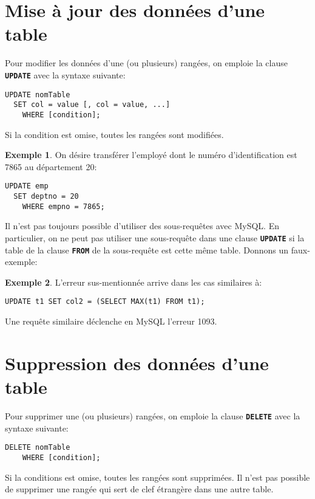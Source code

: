 \documentclass[a4paper, 12pt]{report}
\newcommand{\textSQL}[1]{\texttt{\textbf{#1}}}
\theoremstyle{definition} \newtheorem{ex}{Exemple}
\begin{document}
\section{Mise à jour des données d'une table}
Pour modifier les données d'une (ou plusieurs) rangées, on emploie la clause \textSQL{UPDATE} avec la syntaxe suivante:
\begin{lstlisting}[frame=single]
UPDATE nomTable
  SET col = value [, col = value, ...]
	WHERE [condition];
\end{lstlisting}
Si la condition est omise, toutes les rangées sont modifiées.
\begin{ex}
On désire transférer l'employé dont le numéro d'identification est 7865 au département 20:
\begin{lstlisting}[frame=single]
UPDATE emp
  SET deptno = 20
	WHERE empno = 7865;
\end{lstlisting}
\end{ex}

Il n'est pas toujours possible d'utiliser des sous-requêtes avec MySQL. En particulier, on ne peut pas utiliser une sous-requête dans une clause \textSQL{UPDATE} si la table de la clause \textSQL{FROM} de la sous-requête est cette même table. Donnons un faux-exemple:
\begin{ex}
L'erreur sus-mentionnée arrive dans les cas similaires à:
\begin{lstlisting}[frame=single]
UPDATE t1 SET col2 = (SELECT MAX(t1) FROM t1);
\end{lstlisting}
Une requête similaire déclenche en MySQL l'erreur 1093.
\end{ex}

\section{Suppression des données d'une table}
Pour supprimer une (ou plusieurs) rangées, on emploie la clause \textSQL{DELETE} avec la syntaxe suivante:
\begin{lstlisting}[frame=single]
DELETE nomTable
	WHERE [condition];
\end{lstlisting}
Si la conditions est omise, toutes les rangées sont supprimées. Il n'est pas possible de supprimer une rangée qui sert de clef étrangère dans une autre table.
\end{document}
